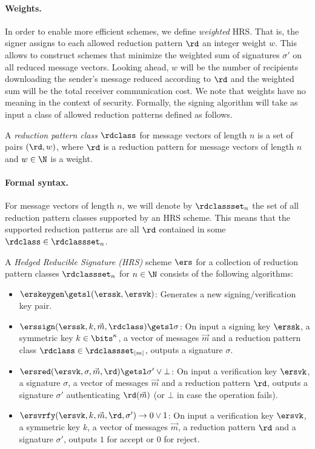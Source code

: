 \paragraph{Weights.}
In order to enable more efficient schemes, we define \emph{weighted} HRS. That is, the signer assigns to each allowed reduction pattern $\rd$ an integer weight $w$. This allows to construct schemes that minimize the weighted sum of signatures $\sigma'$ on all reduced message vectors. Looking ahead, $w$ will be the number of recipients downloading the sender's message reduced according to $\rd$ and the weighted sum will be the total receiver communication cost.
We note that weights have no meaning in the context of security.
%
Formally, the signing algorithm will take as input a class of allowed reduction patterns defined as follows.
\begin{definition}
  A \emph{reduction pattern class} $\rdclass$ for message vectors of length $n$ is a set of pairs $(\rd, w)$, where $\rd$ is a reduction pattern for message vectors of length $n$ and $w \in \N$ is a weight.
\end{definition}

\paragraph{Formal syntax.}
For message vectors of length $n$, we will denote by $\rdclassset_n$ the set of all reduction pattern classes supported by an HRS scheme. This means that the supported reduction patterns are all $\rd$ contained in some $\rdclass \in \rdclassset_n$.

\begin{definition}[$\ers$]
  A \emph{Hedged Reducible Signature (HRS)} scheme $\ers$ for a collection of reduction pattern classes $\rdclassset_n$ for $n \in \N$ consists of the following algorithms:
  \begin{itemize}[align=left, nosep]
    \item[] $\erskeygen \getsl (\erssk,\ersvk)$: Generates a new signing/verification key pair.
    \item[] $\erssign(\erssk, k, \vec{m},\rdclass)\getsl \sigma$: On input a signing key $\erssk$, a symmetric key
    $k \in \bits^\kappa$, a vector of messages $\vec{m}$ and a reduction pattern class $\rdclass\in\rdclassset_{|m|}$,
    outputs a signature $\sigma$.
    \item[] $\ersred(\ersvk, \sigma, \vec{m}, \rd) \getsl \sigma'\vee\bot$: On input a verification key $\ersvk$, a signature $\sigma$, a vector of messages $\vec m$ and a reduction pattern $\rd$, outputs a signature $\sigma'$ authenticating $\rd(\vec m)$ (or $\bot$ in case the operation fails).
    \item[] $\ersvrfy(\ersvk, k, \vec{m}, \rd, \sigma')\rightarrow 0\vee 1$: On input a verification key $\ersvk$,
    a symmetric key $k$, a vector of messages $\vec{m}$, a reduction pattern $\rd$ and a signature $\sigma'$, outputs $1$ for accept or $0$ for reject.
  \end{itemize}
\end{definition}


